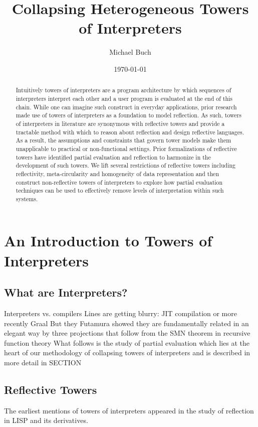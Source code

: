 \documentclass[fleqn]{article}
\title{Collapsing Heterogeneous Towers of Interpreters}
\author{Michael Buch}
\date{\today}
\theoremstyle{definition}
\begin{document}
\maketitle
\frenchspacing
\tableofcontents

\begin{abstract}
Intuitively towers of interpreters are a program architecture by which sequences of interpreters interpret each other and a user program is evaluated at the end of this chain. While one can imagine such
construct in everyday applications, prior research made use of towers of interpreters as a foundation to model reflection. As such, towers of interpreters in literature are synonymous with reflective towers and provide a tractable method with which to reason about reflection and design reflective languages. As a result, the assumptions and constraints that govern tower models make them unapplicable to practical or non-functional
settings. Prior formalizations of reflective towers have identified partial evaluation and reflection to harmonize in the development of such towers. We lift several restrictions of reflective towers including reflectivity, meta-circularity and homogeneity of data representation and then construct non-reflective towers
of interpreters to explore how partial evaluation techniques can be used to effectively remove levels of interpretation within such systems. %
\end{abstract}

\section{An Introduction to Towers of Interpreters}
\subsection{What are Interpreters?}
Interpreters vs. compilers
Lines are getting blurry: JIT compilation or more recently Graal
But they Futamura showed they are fundamentally related in an elegant way by three projections that follow from the SMN theorem in recursive function theory
What follows is the study of partial evaluation which lies at the heart of our methodology of collapsing towers of interpreters and is described in more detail in SECTION

\subsection{Reflective Towers}
The earliest mentions of towers of interpreters appeared in the study of reflection in LISP and its derivatives.
\end{document}
